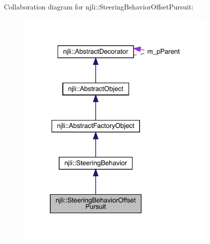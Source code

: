 Collaboration diagram for njli\+:\+:Steering\+Behavior\+Offset\+Pursuit\+:\nopagebreak
\begin{figure}[H]
\begin{center}
\leavevmode
\includegraphics[width=275pt]{classnjli_1_1_steering_behavior_offset_pursuit__coll__graph}
\end{center}
\end{figure}
